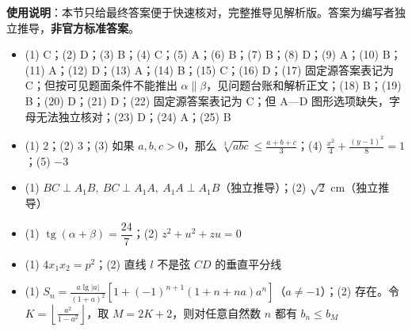 
\begin{gknotice}
\textbf{使用说明}：本节只给最终答案便于快速核对，完整推导见解析版。答案为编写者独立推导，\textbf{非官方标准答案}。
\end{gknotice}

\begin{itemize}[leftmargin=2.6em]
  \item[\textbf{1.}] (1) C；(2) D；(3) B；(4) C；(5) A；(6) B；(7) B；(8) D；(9) A；(10) B；(11) A；(12) D；(13) A；(14) B；(15) C；(16) D；(17) 固定源答案表记为 C；但按可见题面条件不能推出 $\alpha\parallel\beta$，见问题台账和解析正文；(18) B；(19) B；(20) D；(21) D；(22) 固定源答案表记为 C；但 A—D 图形选项缺失，字母无法独立核对；(23) D；(24) A；(25) B
  \item[\textbf{2.}] (1) $2$；(2) $3$；(3) 如果 $a,b,c>0$，那么 $\sqrt[3]{abc}\leq\frac{a+b+c}{3}$；(4) $\displaystyle\frac{x^2}{4}+\frac{(y-1)^2}{8}=1$；(5) $-3$
  \item[\textbf{3.}] (1) $BC\perp A_1B,\ BC\perp A_1A,\ A_1A\perp A_1B$（独立推导）；(2) $\sqrt2\text{ cm}$（独立推导）
  \item[\textbf{4.}] (1) $\operatorname{tg}(\alpha+\beta)=\dfrac{24}{7}$；(2) $z^2+u^2+zu=0$
  \item[\textbf{5.}] (1) $4x_1x_2=p^2$；(2) 直线 $l$ 不是弦 $CD$ 的垂直平分线
  \item[\textbf{6.}] (1) $\displaystyle S_n=\frac{a\lg|a|}{(1+a)^2}\left[1+(-1)^{n+1}(1+n+na)a^n\right]$（$a\ne-1$）；(2) 存在。令 $\displaystyle K=\left\lfloor\frac{a^2}{1-a^2}\right\rfloor$，取 $M=2K+2$，则对任意自然数 $n$ 都有 $b_n\leq b_M$
\end{itemize}
